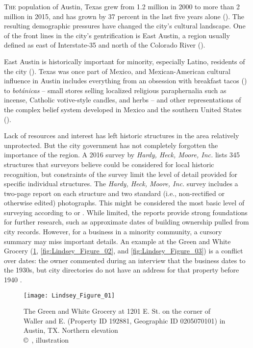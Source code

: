 \IJSRAopening%
\lettrine{T}{he} population of Austin, Texas grew from \num{1.2} million in 2000 to more than \num{2} million in 2015, and has grown by \num{37} percent in the last five years alone (\cite{kerr}). The resulting demographic pressures have changed the city's cultural landscape. One of the front lines in the city's gentrification is East Austin, a region usually defined as east of Interstate-35 and north of the Colorado River (\cite{hernandez}).

East Austin is historically important for minority, especially Latino, residents of the city (\cite{hernandez}). Texas was once part of Mexico, and Mexican-American cultural influence in Austin includes everything from an obsession with breakfast tacos (\cite{hernandez}) to \emph{botánicas} 
-- small stores selling localized religious paraphernalia such as incense, Catholic votive-style candles, and herbs --
and other representations of the complex belief system developed in Mexico and the southern United States (\cite{kreneck}).

Lack of resources and interest has left historic structures in the area relatively unprotected. But the city government has not completely forgotten the importance of the region. A 2016 survey by \emph{Hardy, Heck, Moore, Inc.} lists \num{345} structures that surveyors believe could be considered for local historic recognition, but constraints of the survey limit the level of detail provided for specific individual structures. The \emph{Hardy, Heck, Moore, Inc.} survey includes a two-page report on each structure and two standard (i.e., non-rectified or otherwise edited) photographs. This might be considered the most basic level of surveying according to \textcite[25]{lane} or \textcite[370]{pluciennik}. 
While limited, the reports provide strong foundations for further research, such as approximate dates of building ownership pulled from city records. However, for a business in a minority community, a cursory summary may miss important details. 
An example at the Green and White Grocery (\cref{fig:Lindsey_Figure_01}, \cref{fig:Lindsey_Figure_02}, and \cref{fig:Lindsey_Figure_03}) is a conflict over dates: the owner commented during an interview that the business dates to the 1930s, but city directories do not have an address for that property before 1940 
\parencite[75-76]{hardy}.

\begin{figure}[!htb]
	\texttt{[image: Lindsey\_Figure\_01]}
	\caption{The Green and White Grocery at 1201 E.  St. on the corner of Waller and E.  
(Property ID 192881, Geographic ID 0205070101) 
in Austin, TX. Northern elevation\\
		{\normalfont\scriptsize \copyright\
			\shortauthor, illustration
	}}
	\label{fig:Lindsey_Figure_01}
\end{figure}

